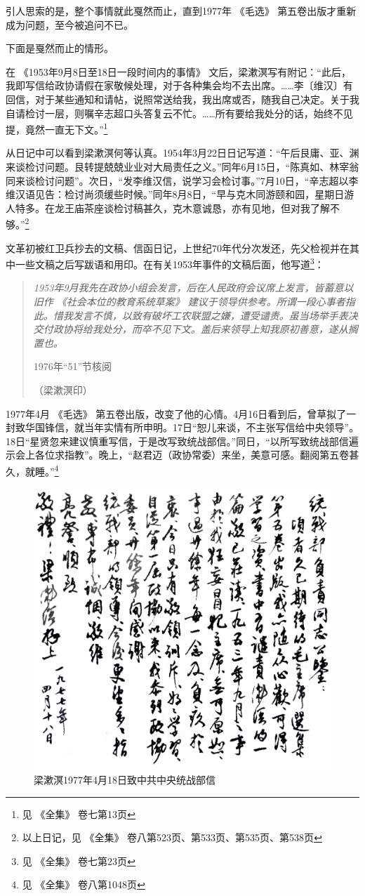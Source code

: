 \documentclass[a4paper,punct=kaiming]{ctexart}
\begin{document}
引人思索的是，整个事情就此戛然而止，直到1977年 《毛选》 第五卷出版才重新成为问题，至今被追问不已。

下面是戛然而止的情形。

在 《1953年9月8日至18日一段时间内的事情》 文后，梁漱溟写有附记：“此后，我即写信给政协请假在家敬候处理，对于各种集会均不去出席。……李〔维汉〕有回信，对于某些通知和请帖，说照常送给我，我出席或否，随我自己决定。关于我自请检讨一层，则嘱辛志超口头答复云不忙。……所有要给我处分的话，始终不见提，竟然一直无下文。”\footnote{见 《全集》 卷七第13页}

从日记中可以看到梁漱溟何等认真。1954年3月22日日记写道：“午后艮庸、亚、渊来谈检讨问题。艮转提兢兢业业对大局责任之义。”同年6月15日，“陈真如、林宰翁同来谈检讨问题”。次日，“发李维汉信，说学习会检讨事。”7月10日，“辛志超以李维汉语见告：检讨尚须缓些时候。”同年8月8日，“早与克木同游颐和园，星期日游人特多。在龙王庙茶座谈检讨稿甚久，克木意诚恳，亦有见地，但对我了解不够。”\footnote{以上日记，见 《全集》 卷八第523页、第533页、第535页、第538页}

文革初被红卫兵抄去的文稿、信函日记，上世纪70年代分次发还，先父检视并在其中一些文稿之后写跋语和用印。在有关1953年事件的文稿后面，他写道\footnote{见 《全集》 卷七第23页}：
\begin{quotation}\em
  1953年9月我先在政协小组会发言，后在人民政府会议席上发言，皆蓄意以旧作 《社会本位的教育系统草案》 建议于领导供参考。所谓一段心事者指此。惜我发言不慎，以致有破坏工农联盟之嫌，遭受谴责。虽当场举手表决交付政协将给我处分，而卒不见下文。盖后来领导上知我原初善意，遂从搁置也。

  \hfill 1976年“51”节核阅\hspace*{2em}

  \hfill （梁漱溟印）\hspace*{2em}
\end{quotation}

1977年4月 《毛选》 第五卷出版，改变了他的心情。4月16日看到后，曾草拟了一封致华国锋信，就当年实情有所申明。17日“恕儿来谈，不主张写信给中央领导”。18日“星贤忽来建议慎重写信，于是改写致统战部信。”同日，“以所写致统战部信遍示会上各位求指教”。晚上，“赵君迈（政协常委）来坐，美意可感。翻阅第五卷甚久，就睡。”\footnote{见 《全集》 卷八第1048页}

\begin{figure}[h]
  \centering
  \includegraphics[width=.5\textwidth]{liang-19770418}
  \caption*{梁漱溟1977年4月18日致中共中央统战部信}
\end{figure}
\end{document}
